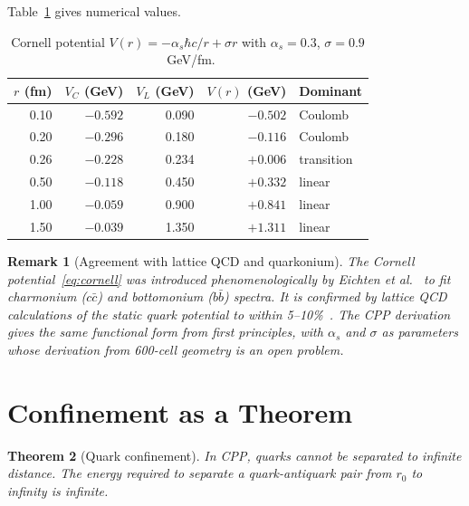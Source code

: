 \documentclass[12pt]{article}
\newtheorem{theorem}{Theorem}[section]
\newtheorem{remark}[theorem]{Remark}
\newcommand{\as}{\alpha_s}
\begin{document}
Table~\ref{tab:cornell} gives numerical values.

\begin{table}[h]
\centering
\caption{Cornell potential $V(r) = -\as\hbar c/r + \sigma r$ with
$\as = 0.3$, $\sigma = 0.9$~GeV/fm.}
\label{tab:cornell}
\renewcommand{\arraystretch}{1.3}
\begin{tabular}{@{}rrrrl@{}}
\toprule
$r$ (fm) & $V_C$ (GeV) & $V_L$ (GeV) & $V(r)$ (GeV) & Dominant \\
\midrule
0.10 & $-0.592$ & 0.090 & $-0.502$ & Coulomb \\
0.20 & $-0.296$ & 0.180 & $-0.116$ & Coulomb \\
0.26 & $-0.228$ & 0.234 & $+0.006$ & transition \\
0.50 & $-0.118$ & 0.450 & $+0.332$ & linear \\
1.00 & $-0.059$ & 0.900 & $+0.841$ & linear \\
1.50 & $-0.039$ & 1.350 & $+1.311$ & linear \\
\bottomrule
\end{tabular}
\end{table}

\begin{remark}[Agreement with lattice QCD and quarkonium]
The Cornell potential~\eqref{eq:cornell} was introduced
phenomenologically by Eichten \textit{et al.}~\cite{cornell1978} to
fit charmonium ($c\bar c$) and bottomonium ($b\bar b$) spectra. It
is confirmed by lattice QCD calculations of the static quark potential
to within 5--10\%~\cite{bali2001}. The CPP derivation gives the same
functional form from first principles, with $\as$ and $\sigma$ as
parameters whose derivation from 600-cell geometry is an open problem.
\end{remark}

\section{Confinement as a Theorem}
\label{sec:confinement}

\begin{theorem}[Quark confinement]
\label{thm:confinement}
In CPP, quarks cannot be separated to infinite distance. The energy
required to separate a quark-antiquark pair from $r_0$ to infinity is
infinite.
\end{theorem}
\end{document}
